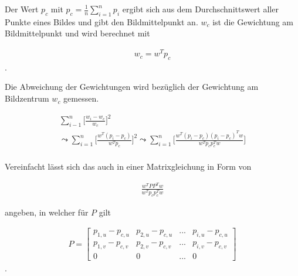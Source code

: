 %
 
Der Wert $p_c$ mit  $p_c = \frac{1}{n} \sum_{i=1}^{n} p_i$ ergibt sich aus dem Durchschnittswert aller Punkte eines Bildes und gibt den Bildmittelpunkt an. $w_c$ ist die Gewichtung am Bildmittelpunkt und wird berechnet mit

\begin{gather}
	w_c = w^Tp_c
\end{gather}.


Die Abweichung der Gewichtungen wird bezüglich der Gewichtung am Bildzentrum $w_c$ gemessen. 

\begin{gather}
	\sum_{i-1}^{n}\Big[\frac{w_i-w_c}{w_c} \Big]^2\\
	\leadsto \sum_{i=1}^{n}\Big[\frac{w^T (p_i-p_c)}{w^Tp_c} \Big]^2
	\leadsto \sum_{i=1}^{n}\Big[\frac{w^T (p_i-p_c)(p_i-p_c)^Tw}{w^Tp_cp_c^Tw} \Big]
\end{gather}\\

%

Vereinfacht lässt sich das auch in einer Matrixgleichung in Form von

\begin{gather}
	\frac{w^TPP^Tw}{w^Tp_cp_c^Tw} \label{eq:MinimizationBild1}
\end{gather}

angeben, in welcher für $P$ gilt

\begin{gather}
	P=\begin{bmatrix}
		p_{1,u}-p_{c,u}&p_{2,u}-p_{c,u}&...&p_{i,u}-p_{c,u}\\
		p_{1,v}-p_{c,v}&p_{2,v}-p_{c,v}&...&p_{i,v}-p_{c,v}\\\label{eq:P}
		0&0&...&0	
	\end{bmatrix}
\end{gather}.

